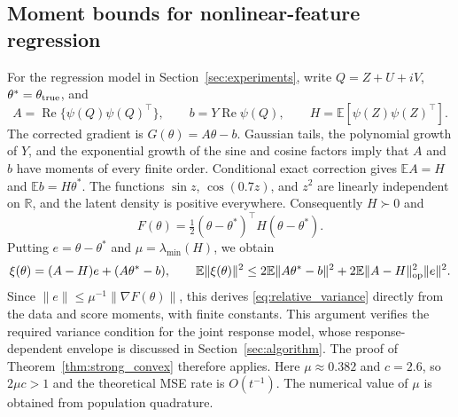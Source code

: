 \subsection{Moment bounds for nonlinear-feature regression}
\label{app:regression}
For the regression model in Section~\ref{sec:experiments}, write
$Q=Z+U+iV$, $\theta^*=\theta_{\rm true}$, and
\[
A=\operatorname{Re}\{\psi(Q)\psi(Q)^\top\},\qquad
b=Y\operatorname{Re}\psi(Q),\qquad
H=\mathbb E[\psi(Z)\psi(Z)^\top].
\]
The corrected gradient is $G(\theta)=A\theta-b$.
Gaussian tails, the polynomial growth of $Y$, and the exponential growth
of the sine and cosine factors imply that $A$ and $b$ have moments of
every finite order. Conditional exact correction gives
$\mathbb EA=H$ and $\mathbb Eb=H\theta^*$.
The functions $\sin z$, $\cos(0.7z)$, and $z^2$ are linearly independent
on $\mathbb R$, and the latent density is positive everywhere.
Consequently $H\succ0$ and
\[
F(\theta)=\tfrac12(\theta-\theta^*)^\top H(\theta-\theta^*).
\]
Putting $e=\theta-\theta^*$ and $\mu=\lambda_{\min}(H)$, we obtain
\[
\xi(\theta)=(A-H)e+(A\theta^*-b),\qquad
\mathbb E\|\xi(\theta)\|^2
\le 2\mathbb E\|A\theta^*-b\|^2
+2\mathbb E\|A-H\|_{\rm op}^2\|e\|^2.
\]
Since $\|e\|\le\mu^{-1}\|\nabla F(\theta)\|$, this derives
\eqref{eq:relative_variance} directly from the data and score moments,
with finite constants. This argument verifies the required variance
condition for the joint response model, whose response-dependent envelope
is discussed in Section~\ref{sec:algorithm}. The proof of
Theorem~\ref{thm:strong_convex} therefore applies.
Here $\mu\approx0.382$ and $c=2.6$, so $2\mu c>1$ and the theoretical
MSE rate is $O(t^{-1})$.
The numerical value of $\mu$ is obtained from population quadrature.
